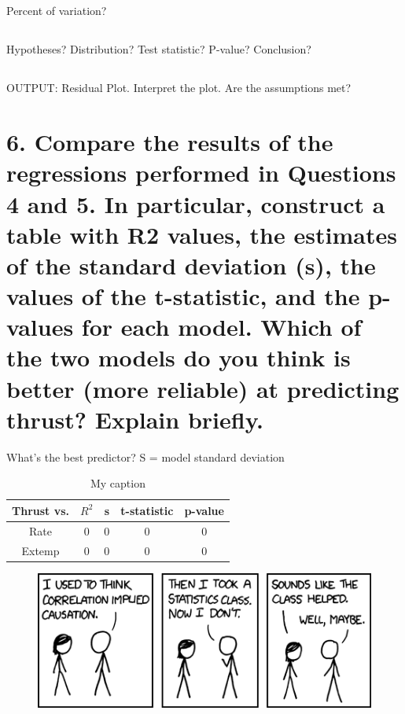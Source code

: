 \documentclass[letterpaper]{article}
\begin{document}
\subsection{}
Percent of variation?

\subsection{}
Hypotheses? Distribution? Test statistic? P-value? Conclusion?

\setcounter{subsection}{6}
\subsection{}
OUTPUT: Residual Plot. Interpret the plot. Are the assumptions met?

\section{6.	Compare the results of the regressions performed in Questions 4 and 5. In particular, construct a table with R2 values, the estimates of the standard deviation (s), the values of the t-statistic, and the p-values for each model. Which of the two models do you think is better (more reliable) at predicting thrust? Explain briefly.}
What’s the best predictor? S = model standard deviation

\begin{table}[H]
 \centering
 \begin{tabular}{|c|c|c|c|c|}
  \hline
  Thrust vs. & $R^2$ & s & t-statistic & p-value \\ \hline
  Rate       & 0     & 0 & 0           & 0       \\ \hline
  Extemp     & 0     & 0 & 0           & 0       \\ \hline
 \end{tabular}
 \caption{My caption}
 \label{q6}
\end{table}


\newpage
\thispagestyle{empty}
\begin{figure}
 \centering
 \includegraphics[width=\textwidth]{correlation.png}
 \label{xkcd}
\end{figure}
\end{document}
